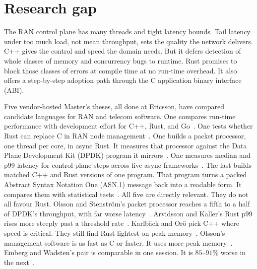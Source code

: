 \documentclass[english,oneside,a4paper,censored,csm,software-track-2020]{HYthesisML}
\begin{document}
\section{Research gap}\label{sec:gap}
The RAN control plane has many threads and
tight latency bounds. Tail latency under too much load, not mean throughput, sets
the quality the network delivers. C++ gives the control and speed the domain
needs. But it defers detection of whole classes of memory and concurrency bugs
to runtime. Rust promises to block those classes of errors at compile time at no
run-time overhead. It also offers a step-by-step adoption path through the C
application binary interface (ABI).

Five vendor-hosted Master's theses, all
done at Ericsson, have compared candidate languages for RAN and telecom
software. One compares run-time performance with development effort for C++,
Rust, and Go~\cite{karlback2021ran}. One tests whether Rust can replace C in
RAN node management~\cite{olsson2023ranmgmt}. One builds a packet
processor, one thread per core, in async Rust. It measures that processor
against the Data Plane Development Kit (DPDK) program it
mirrors~\cite{olsson2023asyncpackets}. One measures median and p99 latency for
control-plane steps across five async
frameworks~\cite{arvidsson2025async}. The last builds matched C++ and Rust
versions of one program. That program turns a packed Abstract Syntax Notation
One (ASN.1) message back into a readable form. It compares
them with statistical tests~\cite{emberg2023asn1}. All five are directly
relevant. They do not all favour Rust. Olsson and Stenstr\"om's packet
processor reaches a fifth to a half of DPDK's throughput, with far worse
latency~\cite{olsson2023asyncpackets}. Arvidsson and Kaller's Rust p99 rises
more steeply past a threshold rate~\cite{arvidsson2025async}. Karlb\"ack and
Or\"o pick C++ where speed is critical. They still find Rust lightest on peak
memory~\cite{karlback2021ran}. Olsson's management software is as fast as C or
faster. It uses more peak memory~\cite{olsson2023ranmgmt}. Emberg and
Wadsten's pair is comparable in one session. It is $85$--$91\%$ worse in the
next~\cite{emberg2023asn1}.
\end{document}
